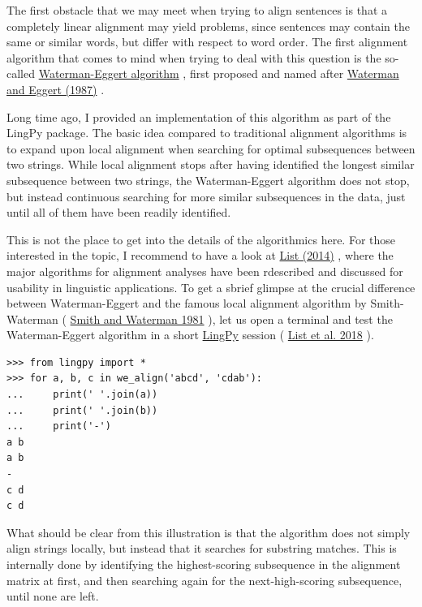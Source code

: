 \documentclass[
  a4paper,
  14pt,
  oneside,
  tablecaptionabove
]{scrbook}
\begin{document}
The first obstacle that we may meet when trying to align sentences is
that a completely linear alignment may yield problems, since sentences
may contain the same or similar words, but differ with respect to word
order. The first alignment algorithm that comes to mind when trying to
deal with this question is the so-called
\href{http://www.bioinformatics.nl/cgi-bin/emboss/help/matcher}{Waterman-Eggert
algorithm} , first proposed and named after
\href{http://bibliography.lingpy.org?key=Waterman1987}{Waterman and
Eggert (1987)} .

Long time ago, I provided an implementation of this algorithm as part of
the LingPy package. The basic idea compared to traditional alignment
algorithms is to expand upon local alignment when searching for optimal
subsequences between two strings. While local alignment stops after
having identified the longest similar subsequence between two strings,
the Waterman-Eggert algorithm does not stop, but instead continuous
searching for more similar subsequences in the data, just until all of
them have been readily identified.

This is not the place to get into the details of the algorithmics here.
For those interested in the topic, I recommend to have a look at
\href{http://bibliography.lingpy.org?key=List2014d}{List (2014)} , where
the major algorithms for alignment analyses have been rdescribed and
discussed for usability in linguistic applications. To get a sbrief
glimpse at the crucial difference between Waterman-Eggert and the famous
local alignment algorithm by Smith-Waterman (
\href{http://bibliography.lingpy.org?key=Smith1981}{Smith and Waterman
1981} ), let us open a terminal and test the Waterman-Eggert algorithm
in a short \href{http://lingpy.org}{LingPy} session (
\href{http://bibliography.lingpy.org?key=List2018i}{List et al. 2018} ).

\begin{lstlisting}
>>> from lingpy import *
>>> for a, b, c in we_align('abcd', 'cdab'):
...     print(' '.join(a))
...     print(' '.join(b))
...     print('-')
a b
a b
-
c d
c d
\end{lstlisting}

What should be clear from this illustration is that the algorithm does
not simply align strings locally, but instead that it searches for
substring matches. This is internally done by identifying the
highest-scoring subsequence in the alignment matrix at first, and then
searching again for the next-high-scoring subsequence, until none are
left.
\end{document}
